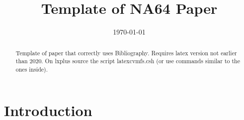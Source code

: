 \documentclass[prd,showpacs,groupedaddress,superscriptaddress,amsmath,amssymb]{revtex4-2} %
\begin{document}


\title{ \bf Template of NA64 Paper}









\date{\today}%



\begin{abstract}
Template of paper that correctly uses Bibliography. Requires latex version not earlier than 2020.
On lxplus source the script latexcvmfs.csh (or use commands similar to the ones inside).
\end{abstract}


\maketitle
\newpage


\section{Introduction}
\end{document}
